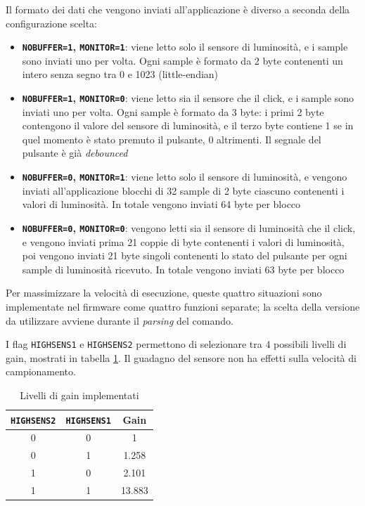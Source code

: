 Il formato dei dati che vengono inviati all'applicazione è diverso a seconda della configurazione scelta:
\begin{itemize}
	\item \textbf{\texttt{NOBUFFER=1}, \texttt{MONITOR=1}}: viene letto solo il sensore di luminosità, e i sample sono inviati uno per volta. Ogni sample è formato da 2 byte contenenti un intero senza segno tra 0 e 1023 (little-endian)
	\item \textbf{\texttt{NOBUFFER=1}, \texttt{MONITOR=0}}: viene letto sia il sensore che il click, e i sample sono inviati uno per volta. Ogni sample è formato da 3 byte: i primi 2 byte contengono il valore del sensore di luminosità, e il terzo byte contiene 1 se in quel momento è stato premuto il pulsante, 0 altrimenti. Il segnale del pulsante è già \textit{debounced}
	\item \textbf{\texttt{NOBUFFER=0}, \texttt{MONITOR=1}}: viene letto solo il sensore di luminosità, e vengono inviati all'applicazione blocchi di 32 sample di 2 byte ciascuno contenenti i valori di luminosità. In totale vengono inviati 64 byte per blocco
	\item \textbf{\texttt{NOBUFFER=0}, \texttt{MONITOR=0}}: vengono letti sia il sensore di luminosità che il click, e vengono inviati prima 21 coppie di byte contenenti i valori di luminosità, poi vengono inviati 21 byte singoli contenenti lo stato del pulsante per ogni sample di luminosità ricevuto. In totale vengono inviati 63 byte per blocco
\end{itemize}

Per massimizzare la velocità di esecuzione, queste quattro situazioni sono implementate nel firmware come quattro funzioni separate; la scelta della versione da utilizzare avviene durante il \textit{parsing} del comando.

I flag \texttt{HIGHSENS1} e \texttt{HIGHSENS2} permettono di selezionare tra 4 possibili livelli di gain, mostrati in tabella \ref{tab:openldat_gains}. Il guadagno del sensore non ha effetti sulla velocità di campionamento.
\begin{table}[h!]
	\centering
	\begin{tabular}{|c|c|c|} 
		\hline
		\texttt{HIGHSENS2} & \texttt{HIGHSENS1} & \textbf{Gain}  \\ 
		\hline
		0 & 0 & 1         \\ 
		\hline
		0 & 1 & 1.258         \\ 
		\hline
		1 & 0 & 2.101         \\ 
		\hline
		1 & 1 & 13.883         \\ 
		\hline
	\end{tabular}
	\caption{\label{tab:openldat_gains}Livelli di gain implementati}
\end{table}

